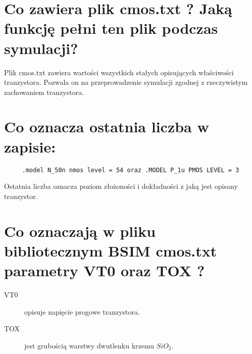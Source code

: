 \documentclass[a4paper, 11pt]{article}
\begin{document}

\section{Co zawiera plik cmos.txt ? Jaką funkcję pełni ten plik podczas symulacji?}\label{sec:zadanie_2} %

Plik cmos.txt zawiera wartości wszystkich stałych opisujących właściwości tranzystora.
Pozwala on na przeprowadzenie symulacji zgodnej z rzeczywistym zachowaniem tranzystora.


\section{Co oznacza ostatnia liczba w zapisie:}\label{sec:zadanie_3} %
\begin{verbatim}
	 .model N_50n nmos level = 54 oraz .MODEL P_1u PMOS LEVEL = 3
\end{verbatim}

Ostatnia liczba oznacza poziom złożoności i dokładności z jaką jest opisany tranzystor.


\section{Co oznaczają w pliku bibliotecznym BSIM cmos.txt parametry VT0 oraz TOX ?}\label{sec:zadanie_4} %

\begin{description}
	\item[VT0] opisuje napięcie progowe tranzystora.
	\item[TOX] jest grubością warstwy dwutlenku krzemu $SiO_2$.
\end{description}

\end{document}
